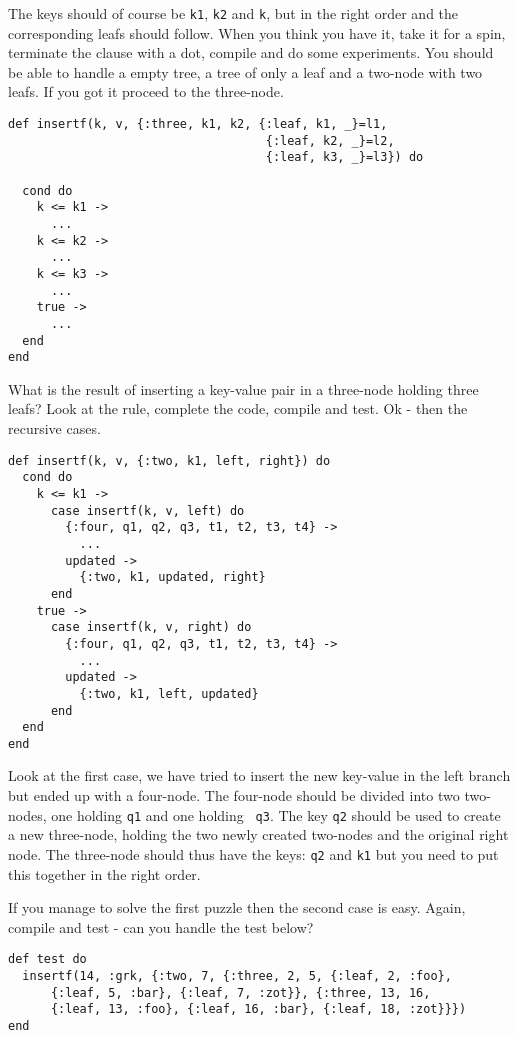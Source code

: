 \documentclass[a4paper,11pt]{article}
\begin{document}
The keys should of course be {\tt k1}, {\tt k2} and {\tt k}, but in
the right order and the corresponding leafs should follow. When you
think you have it, take it for a spin, terminate the clause with a dot,
compile and do some experiments. You should be able to handle a empty
tree, a tree of only a leaf and a two-node with two leafs. If you got
it proceed to the three-node.

\begin{verbatim}
def insertf(k, v, {:three, k1, k2, {:leaf, k1, _}=l1, 
                                    {:leaf, k2, _}=l2, 
                                    {:leaf, k3, _}=l3}) do
                                    
  cond do
    k <= k1 ->  
      ...
    k <= k2 -> 
      ...
    k <= k3 -> 
      ...
    true ->
      ...
  end
end
\end{verbatim}


What is the result of inserting a key-value pair in a three-node
holding three leafs? Look at the rule, complete the code, compile and
test. Ok - then the recursive cases.

\begin{verbatim}
def insertf(k, v, {:two, k1, left, right}) do
  cond do
    k <= k1 ->
      case insertf(k, v, left) do
        {:four, q1, q2, q3, t1, t2, t3, t4} -> 
          ...
        updated ->
          {:two, k1, updated, right}
      end
    true ->
      case insertf(k, v, right) do
        {:four, q1, q2, q3, t1, t2, t3, t4} -> 
          ...
        updated ->
          {:two, k1, left, updated}
      end
  end
end
\end{verbatim}

Look at the first case, we have tried to insert the new key-value in
the left branch but ended up with a four-node. The four-node should be
divided into two two-nodes, one holding {\tt q1} and one holding {\tt
  q3}. The key {\tt q2} should be used to create a new three-node,
holding the two newly created two-nodes and the original right
node. The three-node should thus have the keys: {\tt q2} and {\tt k1} but
you need to put this together in the right order.

If you manage to solve the first puzzle then the second case is
easy. Again, compile and test - can you handle the test below?

\begin{verbatim}
def test do
  insertf(14, :grk, {:two, 7, {:three, 2, 5, {:leaf, 2, :foo},
      {:leaf, 5, :bar}, {:leaf, 7, :zot}}, {:three, 13, 16,
      {:leaf, 13, :foo}, {:leaf, 16, :bar}, {:leaf, 18, :zot}}})
end
\end{verbatim}
\end{document}
